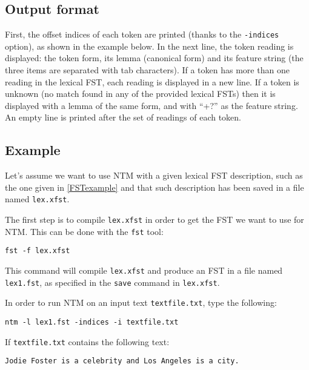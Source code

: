 \documentclass{article}
\newcommand{\tool}[1]{{\tt #1}}
\newcommand{\comm}[1]{{\tt #1}}
\newcommand{\filename}[1]{{\tt #1}}
\begin{document}
\subsection{Output format}

First, the offset indices of each token are printed (thanks to the \comm{-indices} option), as shown in the example below. In the next line, the token reading is displayed: the token form, its lemma (canonical form) and its feature string (the three items are separated with tab characters). If a token has more than one reading in the lexical FST, each reading is displayed in a new line. If a token is unknown (no match found in any of the provided lexical FSTs) then it is displayed with a lemma of the same form, and with ``+?'' as the feature string. An empty line is printed after the set of readings of each token.



\subsection{Example}


Let's assume we want to use NTM with a given lexical FST description, such as the one given in \ref{FSTexample} and that such description has been saved in a file named \filename{lex.xfst}. 

The first step is to compile \filename{lex.xfst} in order to get the FST we want to use for NTM. This can be done with the \tool{fst} tool:

\begin{verbatim}
fst -f lex.xfst
\end{verbatim}



This command will compile \filename{lex.xfst} and produce an FST in a file named \filename{lex1.fst}, as specified in the \comm{save} command in \filename{lex.xfst}. 

In order to run NTM on an input text \filename{textfile.txt}, type the following:

\begin{verbatim}
ntm -l lex1.fst -indices -i textfile.txt
\end{verbatim}

If \filename{textfile.txt} contains the following text:

\begin{verbatim}
Jodie Foster is a celebrity and Los Angeles is a city.
\end{verbatim}
\end{document}
